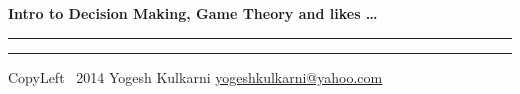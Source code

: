 

\usepackage{beamerarticle} %



\begin{center}
     \Large{\textbf{Intro to Decision Making, Game Theory and likes \ldots} 
	 }  %
\end{center}
\rule{\linewidth}{0.25pt}
\raggedright
\footnotesize
\begin{multicols}{3}





\rule{0.3\linewidth}{0.25pt}

\scriptsize
CopyLeft \textcopyleft\ 2014 Yogesh Kulkarni
\href{http://www.yogeshkulkarni.com}{yogeshkulkarni@yahoo.com}

\end{multicols}

